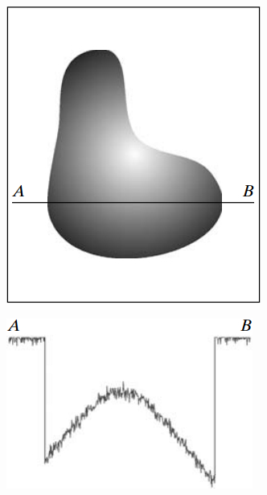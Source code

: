\begin{figure}[htb]
\begin{center}
  \caption{(a) Imagem contínua (b) Linha de varredura do ponto A a B (c) Amostragem e quantização (d) Linha de varredura digital.}
  \begin{subfigure}[b]{0.4\textwidth}
  \centering
      \includegraphics[scale=0.4]{images/sampling/image.jpg}
    \caption{}
    \label{imagemContinua}
  \end{subfigure}
  \begin{subfigure}[b]{0.4\textwidth}
  \centering
    \includegraphics[scale=0.4]{images/sampling/sq.jpg}
    \caption{}
    \label{scanline}
  \end{subfigure}
  

\end{center}
\end{figure}
